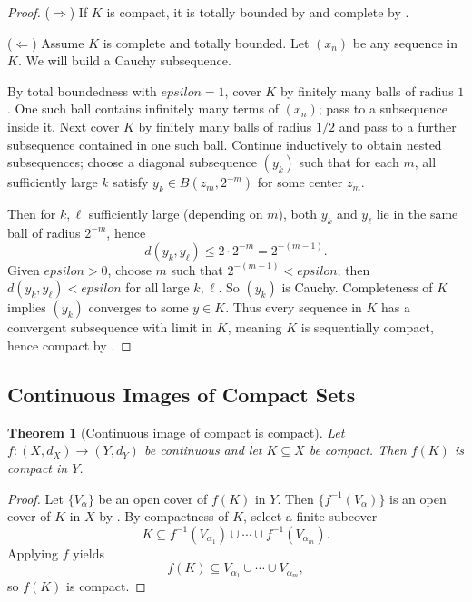 \documentclass[12pt]{article}
\numberwithin{equation}{section}
\def\eps{epsilon}
\newcommand{\eps}{\varepsilon}               %
\theoremstyle{plain}
\newtheorem{theorem}{Theorem}[section]
\theoremstyle{definition}
\theoremstyle{remark}
\begin{document}
\begin{proof}
($\Rightarrow$) If $K$ is compact, it is totally bounded by 
and complete by .

($\Leftarrow$) Assume $K$ is complete and totally bounded.
Let $(x_n)$ be any sequence in $K$.
We will build a Cauchy subsequence.

By total boundedness with $\eps=1$, cover $K$ by finitely many balls of radius $1$.
One such ball contains infinitely many terms of $(x_n)$; pass to a subsequence inside it.
Next cover $K$ by finitely many balls of radius $1/2$ and pass to a further subsequence contained in one such ball.
Continue inductively to obtain nested subsequences; choose a diagonal subsequence $(y_k)$ such that
for each $m$, all sufficiently large $k$ satisfy $y_k\in B(z_m,2^{-m})$ for some center $z_m$.

Then for $k,\ell$ sufficiently large (depending on $m$), both $y_k$ and $y_\ell$ lie in the same ball of radius $2^{-m}$, hence
\[
d(y_k,y_\ell)\le 2\cdot 2^{-m}=2^{-(m-1)}.
\]
Given $\eps>0$, choose $m$ such that $2^{-(m-1)}<\eps$; then $d(y_k,y_\ell)<\eps$ for all large $k,\ell$.
So $(y_k)$ is Cauchy. Completeness of $K$ implies $(y_k)$ converges to some $y\in K$.
Thus every sequence in $K$ has a convergent subsequence with limit in $K$, meaning $K$ is sequentially compact,
hence compact by .
\end{proof}

\subsection{Continuous Images of Compact Sets}

\begin{theorem}[Continuous image of compact is compact]\label{ms:thm:cont-image-compact}
Let $f:(X,d_X)\to(Y,d_Y)$ be continuous and let $K\subseteq X$ be compact. Then $f(K)$ is compact in $Y$.
\end{theorem}

\begin{proof}
Let $\{V_\alpha\}$ be an open cover of $f(K)$ in $Y$.
Then $\{f^{-1}(V_\alpha)\}$ is an open cover of $K$ in $X$ by .
By compactness of $K$, select a finite subcover
\[
K\subseteq f^{-1}(V_{\alpha_1})\cup\cdots\cup f^{-1}(V_{\alpha_m}).
\]
Applying $f$ yields
\[
f(K)\subseteq V_{\alpha_1}\cup\cdots\cup V_{\alpha_m},
\]
so $f(K)$ is compact.
\end{proof}
\end{document}
